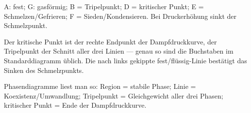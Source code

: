 \begin{ergebnis}
A: fest; G: gasförmig; B = Tripelpunkt; D = kritischer Punkt;
E = Schmelzen/Gefrieren; F = Sieden/Kondensieren. Bei Druckerhöhung sinkt
der Schmelzpunkt.
\end{ergebnis}

\begin{kontrolle}
Der kritische Punkt ist der rechte Endpunkt der Dampfdruckkurve, der
Tripelpunkt der Schnitt aller drei Linien --- genau so sind die Buchstaben
im Standarddiagramm üblich. Die nach links gekippte fest/flüssig-Linie
bestätigt das Sinken des Schmelzpunkts.
\end{kontrolle}

\begin{merksatz}
Phasendiagramme liest man so: Region = stabile Phase; Linie =
Koexistenz/Umwandlung; Tripelpunkt = Gleichgewicht aller drei Phasen;
kritischer Punkt = Ende der Dampfdruckkurve.
\end{merksatz}

